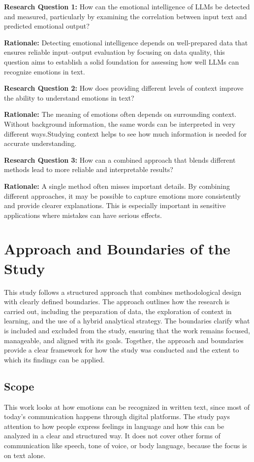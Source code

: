 \noindent\textbf{Research Question 1:} How can the emotional intelligence of LLMs be detected and measured, particularly by examining the correlation between input text and predicted emotional output?  

\textbf{Rationale:} Detecting emotional intelligence depends on well-prepared data that ensures reliable input–output evaluation by focusing on data quality, this question aims to establish a solid foundation for assessing how well LLMs can recognize emotions in text.

\noindent\textbf{Research Question 2:} How does providing different levels of context improve the ability to understand emotions in text?  

\textbf{Rationale:} The meaning of emotions often depends on surrounding context. Without background information, the same words can be interpreted in very different ways.Studying context helps to see how much information is needed for accurate understanding.  

\noindent\textbf{Research Question 3:} How can a combined approach that blends different methods lead to more reliable and interpretable results?  

\textbf{Rationale:} A single method often misses important details. By combining different approaches, it may be possible to capture emotions more consistently and provide clearer explanations. This is especially important in sensitive applications where mistakes can have serious effects.  
\section{Approach and Boundaries of the Study}

This study follows a structured approach that combines methodological design with clearly defined boundaries. The approach outlines how the research is carried out, including the preparation of data, the exploration of context in learning, and the use of a hybrid analytical strategy. The boundaries clarify what is included and excluded from the study, ensuring that the work remains focused, manageable, and aligned with its goals. Together, the approach and boundaries provide a clear framework for how the study was conducted and the extent to which its findings can be applied.
\subsection{Scope}

This work looks at how emotions can be recognized in written text, since most of today’s communication happens through digital platforms. The study pays attention to how people express feelings in language and how this can be analyzed in a clear and structured way. It does not cover other forms of communication like speech, tone of voice, or body language, because the focus is on text alone.  

